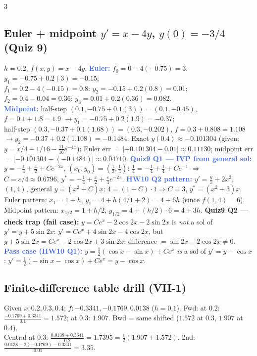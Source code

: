 \documentclass[9pt]{extarticle}
\newcommand{\hl}[1]{\textbf{\textcolor{BrickRed}{#1}}}
\newcommand{\ex}[1]{\textbf{\textcolor{RoyalBlue}{#1}}}
\begin{document}
\begin{multicols}{3}
\begin{sloppypar}
\subsection{Euler + midpoint $y'=x-4y$, $y(0)=-3/4$ (Quiz 9)}
$h=0.2$, $f(x,y)=x-4y$. \ex{Euler:} $f_0=0-4(-0.75)=3$: $y_1=-0.75+0.2(3)=-0.15$;\\
$f_1=0.2-4(-0.15)=0.8$: $y_2=-0.15+0.2(0.8)=0.01$; $f_2=0.4-0.04=0.36$: $y_3=0.01+0.2(0.36)=0.082$.\\
\ex{Midpoint:} half-step $(0.1,-0.75+0.1(3))=(0.1,-0.45)$, $f=0.1+1.8=1.9$ $\to y_1=-0.75+0.2(1.9)=-0.37$;\\
half-step $(0.3,-0.37+0.1(1.68))=(0.3,-0.202)$, $f=0.3+0.808=1.108$ $\to y_2=-0.37+0.2(1.108)=-0.1484$.
Exact $y(0.4)\approx-0.101304$ (given; $y=x/4-1/16-\tfrac{11}{16}e^{-4x}$): Euler err $=|{-0.101304}-0.01|\approx0.11130$; midpoint err $=|{-0.101304}-(-0.1484)|\approx0.04710$.
\ex{Quiz9 Q1 — IVP from general sol:} $y=-\tfrac14+\tfrac x2+Ce^{-2x}$, $(x_0,y_0)=(\tfrac12,\tfrac14)$: $\tfrac14=-\tfrac14+\tfrac14+Ce^{-1}$ $\Rightarrow$ $C=e/4\approx0.6796$, $y^*=-\tfrac14+\tfrac x2+\tfrac e4e^{-2x}$.
\ex{HW10 Q2 pattern:} $y'=\tfrac yx+2x^2$, $(1,4)$, general $y=(x^2+C)x$: $4=(1+C)\cdot1\Rightarrow C=3$, $y^*=(x^2+3)x$. Euler pattern: $x_1=1+h$, $y_1=4+h(4/1+2)=4+6h$ (since $f(1,4)=6$). Midpoint pattern: $x_{1/2}=1+h/2$, $y_{1/2}=4+(h/2)\cdot6=4+3h$.
\hl{Quiz9 Q2 — check trap (fail case):} $y=Ce^x-2\cos2x-2\sin2x$ is \emph{not} a sol of $y'=y+5\sin2x$: $y'=Ce^x+4\sin2x-4\cos2x$, but $y+5\sin2x=Ce^x-2\cos2x+3\sin2x$; difference $=\sin2x-2\cos2x\ne0$.\\
\ex{Pass case (HW10 Q1):} $y=\tfrac12(\cos x-\sin x)+Ce^x$ \emph{is} a sol of $y'=y-\cos x$: $y'=\tfrac12(-\sin x-\cos x)+Ce^x=y-\cos x$.

\subsection{Finite-difference table drill (VII-1)}
Given $x:0.2,0.3,0.4$; $f:-0.3341,-0.1769,0.0138$ ($h=0.1$). Fwd: at $0.2$: $\tfrac{-0.1769+0.3341}{0.1}=1.572$; at $0.3$: $1.907$. Bwd = same shifted ($1.572$ at $0.3$, $1.907$ at $0.4$).\\
Central at $0.3$: $\tfrac{0.0138+0.3341}{0.2}=1.7395=\tfrac12(1.907+1.572)$. 2nd: $\tfrac{0.0138-2(-0.1769)-0.3341}{0.01}=3.35$.


\end{sloppypar}
\end{multicols}
\end{document}
